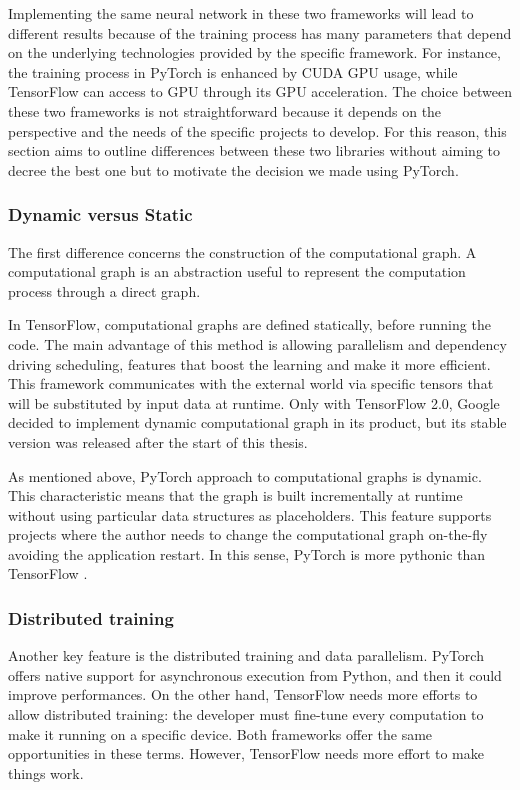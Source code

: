 Implementing the same neural network in these two frameworks will lead to different results because of the training process has many parameters that depend on the underlying technologies provided by the specific framework.
For instance, the training process in PyTorch is enhanced by CUDA GPU usage, while TensorFlow can access to GPU through its GPU acceleration.
The choice between these two frameworks is not straightforward because it depends on the perspective and the needs of the specific projects to develop.
For this reason, this section aims to outline differences between these two libraries without aiming to decree the best one but to motivate the decision we made using PyTorch.

\subsubsection{Dynamic versus Static}

The first difference concerns the construction of the computational graph.
A computational graph is an abstraction useful to represent the computation process through a direct graph.

In TensorFlow, computational graphs are defined statically, before running the code.
The main advantage of this method is allowing parallelism and dependency driving scheduling, features that boost the learning and make it more efficient.
This framework communicates with the external world via specific tensors that will be substituted by input data at runtime.
Only with TensorFlow 2.0, Google decided to implement dynamic computational graph in its product, but its stable version was released after the start of this thesis.

As mentioned above, PyTorch approach to computational graphs is dynamic.
This characteristic means that the graph is built incrementally at runtime without using particular data structures as placeholders.
This feature supports projects where the author needs to change the computational graph on-the-fly avoiding the application restart.
In this sense, PyTorch is more pythonic than TensorFlow \cite{builtin2019pytorch}.

\subsubsection{Distributed training}

Another key feature is the distributed training and data parallelism.
PyTorch offers native support for asynchronous execution from Python, and then it could improve performances.
On the other hand, TensorFlow needs more efforts to allow distributed training: the developer must fine-tune every computation to make it running on a specific device.
Both frameworks offer the same opportunities in these terms.
However, TensorFlow needs more effort to make things work.

